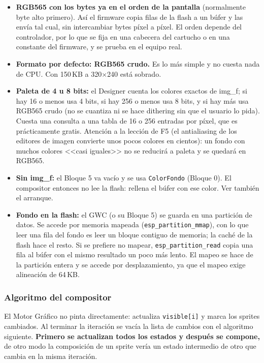 \begin{itemize}
	\item \textbf{RGB565 con los bytes ya en el orden de la pantalla} (normalmente byte alto primero). Así el firmware copia filas de la flash a un búfer y las envía tal cual, sin intercambiar bytes píxel a píxel. El orden depende del controlador, por lo que se fija en una cabecera del cartucho o en una constante del firmware, y se prueba en el equipo real.
	\item \textbf{Formato por defecto: RGB565 crudo.} Es lo más simple y no cuesta nada de CPU. Con 150\,KB a 320$\times$240 está sobrado.
	\item \textbf{Paleta de 4 u 8 bits:} el Designer cuenta los colores exactos de img\_f; si hay 16 o menos usa 4 bits, si hay 256 o menos usa 8 bits, y si hay más usa RGB565 crudo (no se cuantiza ni se hace dithering sin que el usuario lo pida). Cuesta una consulta a una tabla de 16 o 256 entradas por píxel, que es prácticamente gratis. Atención a la lección de F5 (el antialiasing de los editores de imagen convierte unos pocos colores en cientos): un fondo con muchos colores <<casi iguales>> no se reducirá a paleta y se quedará en RGB565.
	\item \textbf{Sin img\_f:} el Bloque 5 va vacío y se usa \texttt{ColorFondo} (Bloque 0). El compositor entonces no lee la flash: rellena el búfer con ese color. Ver también el arranque.
	\item \textbf{Fondo en la flash:} el GWC (o su Bloque 5) se guarda en una partición de datos. Se accede por memoria mapeada (\texttt{esp\_partition\_mmap}), con lo que leer una fila del fondo es leer un bloque contiguo de memoria; la caché de la flash hace el resto. Si se prefiere no mapear, \texttt{esp\_partition\_read} copia una fila al búfer con el mismo resultado un poco más lento. El mapeo se hace de la partición entera y se accede por desplazamiento, ya que el mapeo exige alineación de 64\,KB.
\end{itemize}

\subsubsection{Algoritmo del compositor}

El Motor Gráfico no pinta directamente: actualiza \texttt{visible[i]} y marca los sprites cambiados. Al terminar la iteración se vacía la lista de cambios con el algoritmo siguiente. \textbf{Primero se actualizan todos los estados y después se compone,} de otro modo la composición de un sprite vería un estado intermedio de otro que cambia en la misma iteración.

